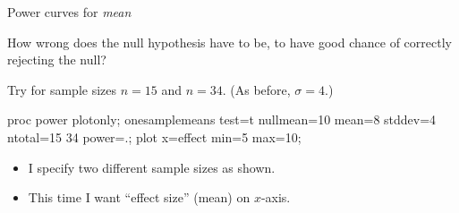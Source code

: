 \documentclass[unknownkeysallowed]{beamer}\usepackage[]{graphicx}\usepackage[]{color}
\begin{document}

\begin{frame}[fragile]{Power curves for \emph{mean}}

  How wrong does the null hypothesis have to be, to have good
  chance of correctly rejecting the null? 
  
  Try for sample sizes $n=15$ and $n=34$. (As before, $\sigma=4$.)
  
  \begin{Sascode}[store=pe]
  proc power plotonly;
    onesamplemeans
      test=t
      nullmean=10
      mean=8
      stddev=4
      ntotal=15 34
      power=.;
    plot x=effect min=5 max=10;    
  \end{Sascode}
  
  \begin{itemize}
  \item   I specify two different sample
    sizes as shown. 
  \item This time I want ``effect size'' (mean) on $x$-axis.
  \end{itemize}
  
\end{frame}
\end{document}
